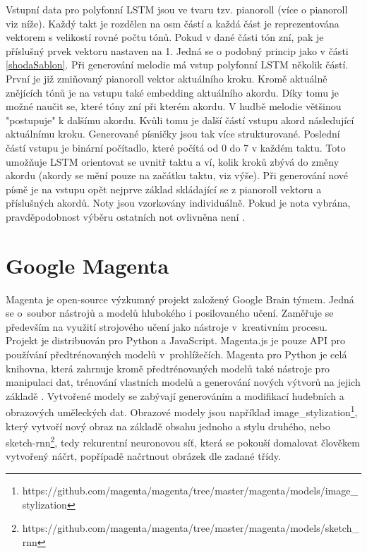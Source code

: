 Vstupní data pro polyfonní LSTM jsou ve tvaru tzv. pianoroll (více o pianoroll viz níže).
Každý takt je rozdělen na osm částí 
a každá část je reprezentována vektorem s velikostí rovné počtu tónů.
Pokud v dané části tón zní, pak je příslušný prvek vektoru nastaven na 1.
Jedná se o podobný princip jako v části \ref{shodaSablon}.
Při generování melodie má vstup polyfonní LSTM několik částí.
První je již zmiňovaný pianoroll vektor aktuálního kroku.
Kromě aktuálně znějících tónů je na vstupu také embedding 
aktuálního akordu.
Díky tomu je možné naučit se, které tóny zní při kterém akordu.
V hudbě melodie většinou "postupuje" k dalšímu akordu.
Kvůli tomu je další částí vstupu akord následující aktuálnímu kroku.
Generované písničky jsou tak více strukturované.
Poslední částí vstupu je binární počítadlo,
které počítá od 0 do 7 v každém taktu.
Toto umožňuje LSTM orientovat se uvnitř taktu
a ví, kolik kroků zbývá do změny akordu 
(akordy se mění pouze na začátku taktu, viz výše).
Při generování nové písně je na vstupu opět nejprve
základ skládající se z pianoroll vektoru a příslušných akordů.
Noty jsou vzorkovány individuálně.
Pokud je nota vybrána,
pravděpodobnost výběru ostatních not ovlivněna není
\cite{Brunner_Jambot}.

\section{Google Magenta}
\label{magenta}
Magenta je open-source výzkumný projekt založený Google Brain týmem.
Jedná se o~soubor nástrojů a modelů hlubokého i posilovaného učení.
Zaměřuje se především na využití strojového učení jako nástroje
v~kreativním procesu.
Projekt je distribuován pro Python a JavaScript.
Magenta.js je pouze API pro používání předtrénovaných modelů v~prohlížečích.
Magenta pro Python je celá knihovna, která zahrnuje kromě předtrénovaných modelů
také nástroje pro manipulaci dat, trénování vlastních modelů a generování
nových výtvorů na jejich základě
\cite{google_magentaHome}.
Vytvořené modely se zabývají generováním a modifikací hudebních 
a obrazových uměleckých dat.
Obrazové modely jsou například image\_stylization\footnote{https://github.com/magenta/magenta/tree/master/magenta/models/image\_stylization},
který vytvoří nový obraz na základě obsahu jednoho a stylu druhého\cite{dumoulin2017learned},
nebo sketch-rnn\footnote{https://github.com/magenta/magenta/tree/master/magenta/models/sketch\_rnn},
tedy rekurentní neuronovou síť, která se pokouší domalovat člověkem vytvořený náčrt,
popřípadě načrtnout obrázek dle zadané třídy\cite{ha2017neural}.
\par

